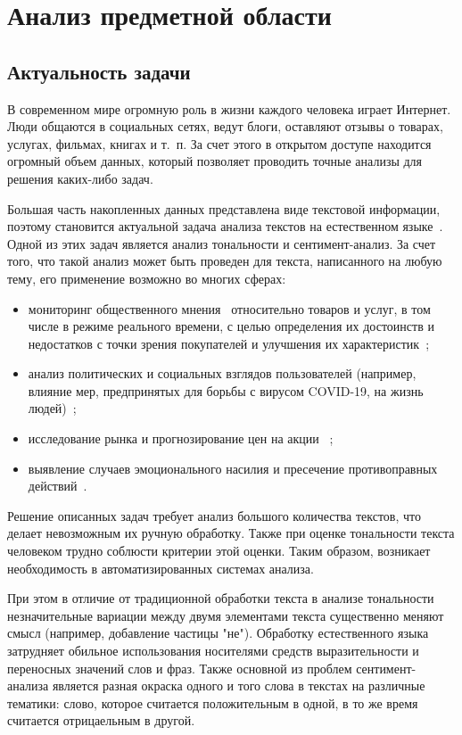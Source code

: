 \chapter{Анализ предметной области}

\section{Актуальность задачи}

В современном мире огромную роль в жизни каждого человека играет Интернет.
Люди общаются в социальных сетях, ведут блоги, оставляют отзывы о товарах,
услугах, фильмах, книгах и т.~п. За счет этого в открытом доступе находится
огромный объем данных, который позволяет проводить точные анализы для
решения каких-либо задач.  

Большая часть накопленных данных представлена виде текстовой информации, поэтому
становится актуальной задача анализа текстов на естественном
языке~\cite{article8}. Одной из этих задач является анализ тональности и
сентимент-анализ. За счет того, что такой анализ может быть проведен для текста,
написанного на любую тему, его применение возможно во многих сферах:
\begin{itemize}
    \item мониторинг общественного мнения~\cite{article1} относительно товаров и
        услуг, в том числе в режиме реального времени, с целью определения их
        достоинств и недостатков с точки зрения покупателей и улучшения их
        характеристик~\cite{article3};
    \item анализ политических и социальных взглядов пользователей (например,
        влияние мер, предпринятых для борьбы с вирусом COVID-19, на жизнь
        людей)~\cite{article3};
    \item исследование рынка и прогнозирование цен на акции
       ~\cite{article3};
    \item выявление случаев эмоционального насилия и пресечение
        противоправных действий~\cite{article6}.
\end{itemize}

Решение описанных задач требует анализ большого количества текстов, что
делает невозможным их ручную обработку. Также при оценке тональности текста
человеком трудно соблюсти критерии этой оценки. Таким образом, возникает
необходимость в автоматизированных системах анализа.

При этом в отличие от традиционной обработки текста в анализе тональности
незначительные вариации между двумя элементами текста существенно меняют смысл
(например, добавление частицы "не"). Обработку естественного языка затрудняет
обильное использования носителями средств выразительности и переносных значений
слов и фраз. Также основной из проблем сентимент-анализа является разная окраска
одного и того слова в текстах на различные тематики: слово, которое считается
положительным в одной, в то же время считается отрицаельным в другой.

